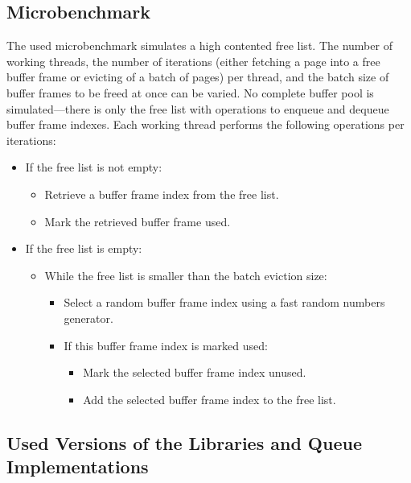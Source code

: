 \subsection[Microbenchmark]{Microbenchmark} \label{subsec:free-list-microbenchmark}

	The used microbenchmark simulates a high contented free list. The number of working threads, the number of iterations (either fetching a page into a free buffer frame or evicting of a batch of pages) per thread, and the batch size of buffer frames to be freed at once can be varied. No complete buffer pool is simulated---there is only the free list with operations to enqueue and dequeue buffer frame indexes. Each working thread performs the following operations per iterations:
	
\begin{@empty}
	\begin{itemize}
		\itemsep0em
		\item If the free list is not empty:
			\begin{itemize}
				\item Retrieve a buffer frame index from the free list.
				\item Mark the retrieved buffer frame used.
			\end{itemize}
		\item If the free list is empty:
			\begin{itemize}
				\item While the free list is smaller than the batch eviction size:
					\begin{itemize}
						\item Select a random buffer frame index using a fast random numbers generator.
						\item If this buffer frame index is marked used:
							\begin{itemize}
								\item Mark the selected buffer frame index unused.
								\item Add the selected buffer frame index to the free list.
							\end{itemize}
					\end{itemize}
			\end{itemize}
	\end{itemize}
\end{@empty}

\subsection[Queue Versions]{Used Versions of the Libraries and Queue Implementations} \label{subsec:free-list-versions}

